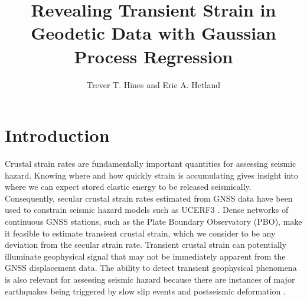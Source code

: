 \documentclass[10pt,letter]{article}
\title{Revealing Transient Strain in Geodetic Data with Gaussian Process Regression}
\author{Trever T. Hines and Eric A. Hetland}
\begin{document}
\maketitle


\section{Introduction}\label{sec:Introduction}
Crustal strain rates are fundamentally important quantities for assessing seismic hazard. Knowing where and how quickly strain is accumulating gives insight into where we can expect stored elastic energy to be released seismically. Consequently, secular crustal strain rates estimated from GNSS data have been used to constrain seismic hazard models such as UCERF3 \citep{Field2014}. Dense networks of continuous GNSS stations, such as the Plate Boundary Observatory (PBO), make it feasible to estimate transient crustal strain, which we consider to be any deviation from the secular strain rate.  Transient crustal strain can potentially illuminate geophysical signal that may not be immediately apparent from the GNSS displacement data. The ability to detect transient geophysical phenomena is also relevant for assessing seismic hazard because there are instances of major earthquakes being triggered by slow slip events \citep{Roeloffs2006} and postseismic deformation \citep{Freed2001}. 
\end{document}

